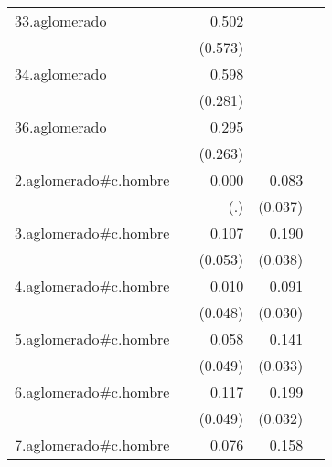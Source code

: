 {\begin{longtable}{l*{4}{D{.}{.}{-1}}}
\addlinespace
33.aglomerado&                     &       0.502         &                     &                     \\
            &                     &     (0.573)         &                     &                     \\
\addlinespace
34.aglomerado&                     &       0.598\sym{*}  &                     &                     \\
            &                     &     (0.281)         &                     &                     \\
\addlinespace
36.aglomerado&                     &       0.295         &                     &                     \\
            &                     &     (0.263)         &                     &                     \\
\addlinespace
2.aglomerado#c.hombre&                     &       0.000         &       0.083\sym{*}  &                     \\
            &                     &         (.)         &     (0.037)         &                     \\
\addlinespace
3.aglomerado#c.hombre&                     &       0.107\sym{*}  &       0.190\sym{***}&                     \\
            &                     &     (0.053)         &     (0.038)         &                     \\
\addlinespace
4.aglomerado#c.hombre&                     &       0.010         &       0.091\sym{**} &                     \\
            &                     &     (0.048)         &     (0.030)         &                     \\
\addlinespace
5.aglomerado#c.hombre&                     &       0.058         &       0.141\sym{***}&                     \\
            &                     &     (0.049)         &     (0.033)         &                     \\
\addlinespace
6.aglomerado#c.hombre&                     &       0.117\sym{*}  &       0.199\sym{***}&                     \\
            &                     &     (0.049)         &     (0.032)         &                     \\
\addlinespace
7.aglomerado#c.hombre&                     &       0.076         &       0.158\sym{***}&                     \\

\end{longtable}}
